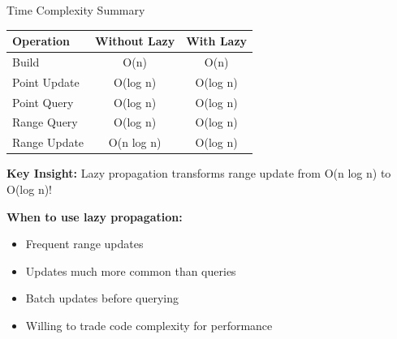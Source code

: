 \documentclass[aspectratio=169]{beamer}
\begin{document}
\begin{frame}{Time Complexity Summary}
  \begin{table}
    \centering
    \begin{tabular}{|l|c|c|}
      \hline
      \textbf{Operation} & \textbf{Without Lazy} & \textbf{With Lazy} \\
      \hline
      Build & O(n) & O(n) \\
      \hline
      Point Update & O(log n) & O(log n) \\
      \hline
      Point Query & O(log n) & O(log n) \\
      \hline
      Range Query & O(log n) & O(log n) \\
      \hline
      Range Update & O(n log n) & O(log n) \\
      \hline
    \end{tabular}
  \end{table}

  \vspace{0.5cm}
  \textbf{Key Insight:} Lazy propagation transforms range update from O(n log n) to O(log n)!

  \vspace{0.5cm}
  \textbf{When to use lazy propagation:}
  \begin{itemize}
    \item Frequent range updates
    \item Updates much more common than queries
    \item Batch updates before querying
    \item Willing to trade code complexity for performance
  \end{itemize}
\end{frame}
\end{document}
